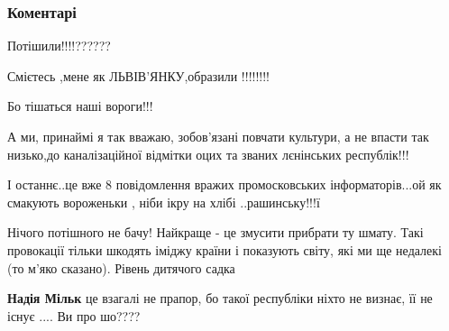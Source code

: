  
 
 
 
 
\subsubsection{Коментарі}

\begin{itemize}
 

Потішили!!!!??????

Смієтесь ,мене як ЛЬВІВ'ЯНКУ,образили !!!!!!!!

Бо тішаться наші вороги!!!

А ми, принаймі я так вважаю, зобов'язані повчати культури, а не впасти так
низько,до каналізаційної відмітки оцих та званих лєнінських республік!!!

І останнє..це вже 8 повідомлення вражих промосковських інформаторів...ой як
смакують вороженьки , ніби ікру на хлібі ..рашинську!!!ї



 

Нічого потішного не бачу! Найкраще - це змусити прибрати ту шмату. Такі
провокації тільки шкодять іміджу країни і показують світу, які ми ще недалекі
(то м'яко сказано). Рівень дитячого садка

\begin{itemize}
 
\textbf{Надія Мільк} це взагалі не прапор, бо такої республіки ніхто не визнає, її не існує .... Ви про шо????


\end{itemize}
\end{itemize}
